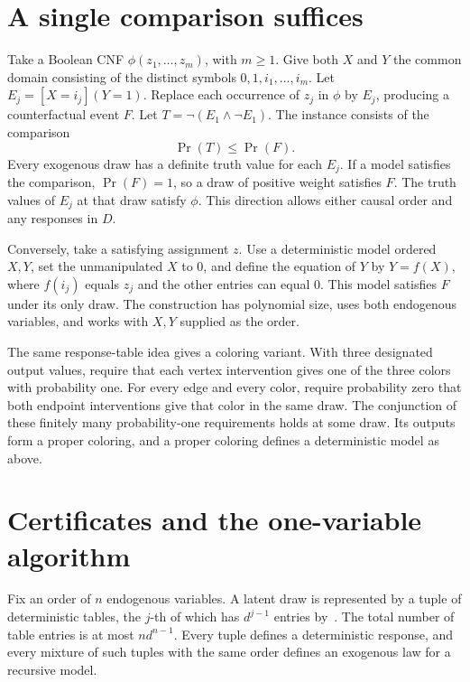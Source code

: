 \documentclass[11pt]{amsart}
\begin{document}
\section{A single comparison suffices}
Take a Boolean CNF \(\phi(z_1,\ldots,z_m)\), with \(m\geq1\). Give both \(X\) and \(Y\) the common domain consisting of the distinct symbols \(0,1,i_1,\ldots,i_m\). Let \(E_j=[X=i_j](Y=1)\). Replace each occurrence of \(z_j\) in \(\phi\) by \(E_j\), producing a counterfactual event \(F\). Let \(T=\neg(E_1\wedge\neg E_1)\). The instance consists of the comparison
\[
                       \Pr(T)\leq\Pr(F).
\]
Every exogenous draw has a definite truth value for each \(E_j\). If a model satisfies the comparison, \(\Pr(F)=1\), so a draw of positive weight satisfies \(F\). The truth values of \(E_j\) at that draw satisfy \(\phi\). This direction allows either causal order and any responses in \(D\).

Conversely, take a satisfying assignment \(z\). Use a deterministic model ordered \(X,Y\), set the unmanipulated \(X\) to \(0\), and define the equation of \(Y\) by \(Y=f(X)\), where \(f(i_j)\) equals \(z_j\) and the other entries can equal \(0\). This model satisfies \(F\) under its only draw. The construction has polynomial size, uses both endogenous variables, and works with \(X,Y\) supplied as the order.

The same response-table idea gives a coloring variant. With three designated output values, require that each vertex intervention gives one of the three colors with probability one. For every edge and every color, require probability zero that both endpoint interventions give that color in the same draw. The conjunction of these finitely many probability-one requirements holds at some draw. Its outputs form a proper coloring, and a proper coloring defines a deterministic model as above.

\section{Certificates and the one-variable algorithm}
Fix an order of \(n\) endogenous variables. A latent draw is represented by a tuple of deterministic tables, the \(j\)-th of which has \(d^{j-1}\) entries by~\cite[Lemma~5.2]{GGW}. The total number of table entries is at most \(n d^{n-1}\). Every tuple defines a deterministic response, and every mixture of such tuples with the same order defines an exogenous law for a recursive model.
\end{document}
